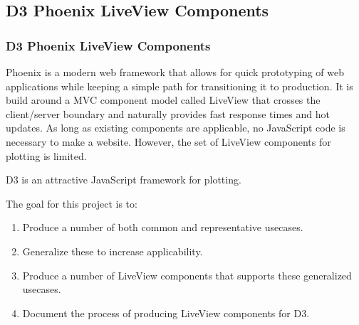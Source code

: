 \subsection{D3 Phoenix LiveView Components}
\begin{frame}
    \frametitle{D3 Phoenix LiveView Components}
    \vspace{0mm}
    Phoenix is a modern web framework that allows for quick prototyping of web applications while keeping a simple path for transitioning it to production. It is build around a MVC component model called LiveView that crosses the client/server boundary and naturally provides fast response times and hot updates. As long as existing components are applicable, no JavaScript code is necessary to make a website. However, the set of LiveView components for plotting is limited.
    
    \vspace{3mm}
    D3 is an attractive JavaScript framework for plotting.
    
    \vspace{3mm}
    The goal for this project is to:
    \begin{enumerate}
      \item Produce a number of both common and representative usecases.
      \item Generalize these to increase applicability.
      \item Produce a number of LiveView components that supports these generalized usecases.
      \item Document the process of producing LiveView components for D3.
    \end{enumerate}

\end{frame}

